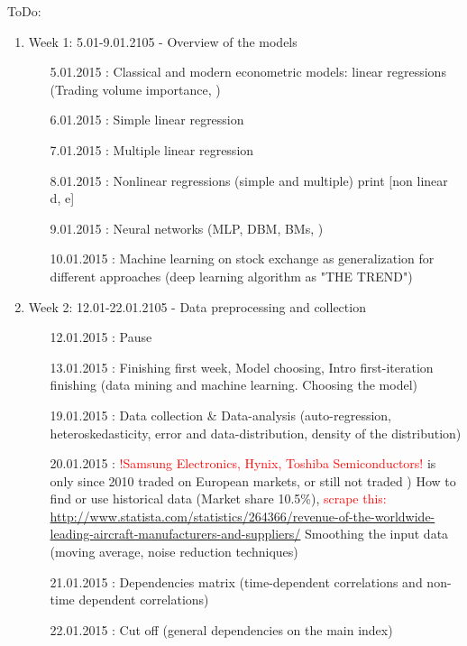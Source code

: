 \documentclass {article}
\begin{document}
ToDo:
\begin{enumerate}
	\item Week 1: 5.01-9.01.2105 - Overview of the models 
	\begin{enumerate}
		\item[5.01.2015]: Classical and modern econometric models:  linear regressions (Trading volume importance, ) 
		\item[6.01.2015]: Simple linear regression 	 		  
		\item[7.01.2015]: Multiple linear regression  
		\item[8.01.2015]: Nonlinear regressions (simple and multiple) print [non linear d, e]  
		\item[9.01.2015]: Neural networks (MLP, DBM, BMs, )
		\item[10.01.2015]: Machine learning on stock exchange as generalization for different approaches (deep learning algorithm as "THE TREND") 
	\end{enumerate}
	\item Week 2: 12.01-22.01.2105 - Data preprocessing and collection
	\begin{enumerate}
		\item[12.01.2015]: Pause  
		\item[13.01.2015]: Finishing first week, Model choosing, Intro first-iteration finishing (data mining and machine learning. Choosing the model)  
		\item[19.01.2015]: Data collection  \& Data-analysis (auto-regression, heteroskedasticity, error and data-distribution, density of the distribution)
		\item[20.01.2015]: \textcolor{red}{!Samsung Electronics, Hynix, Toshiba Semiconductors!} is only since 2010 traded on European markets, or still not traded ) How to find or use historical data (Market share 10.5\%),  \textcolor{red}{scrape this: \url{http://www.statista.com/statistics/264366/revenue-of-the-worldwide-leading-aircraft-manufacturers-and-suppliers/}}
		Smoothing the input data (moving average, noise reduction techniques)
		\item[21.01.2015]: Dependencies matrix  (time-dependent correlations and non-time dependent correlations)
		\item[22.01.2015]: Cut off (general dependencies on the main index)
		

\end{enumerate}
\end{enumerate}
\end{document}
